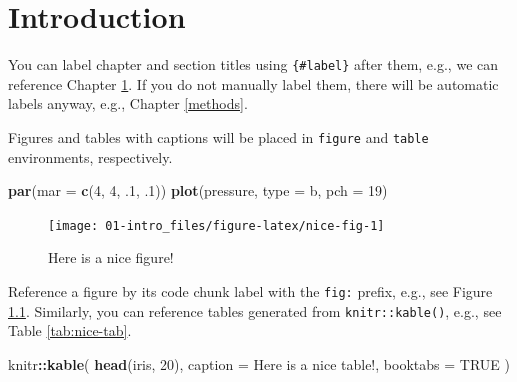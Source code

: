 \documentclass[
]{book}
\newenvironment{Shaded}{\begin{snugshade}}{\end{snugshade}}
\newcommand{\AttributeTok}[1]{\textcolor[rgb]{0.13,0.29,0.53}{#1}}
\newcommand{\ConstantTok}[1]{\textcolor[rgb]{0.56,0.35,0.01}{#1}}
\newcommand{\DecValTok}[1]{\textcolor[rgb]{0.00,0.00,0.81}{#1}}
\newcommand{\FunctionTok}[1]{\textcolor[rgb]{0.13,0.29,0.53}{\textbf{#1}}}
\newcommand{\NormalTok}[1]{#1}
\newcommand{\SpecialCharTok}[1]{\textcolor[rgb]{0.81,0.36,0.00}{\textbf{#1}}}
\newcommand{\StringTok}[1]{\textcolor[rgb]{0.31,0.60,0.02}{#1}}
\begin{document}
\chapter{Introduction}\label{intro}

You can label chapter and section titles using \texttt{\{\#label\}} after them, e.g., we can reference Chapter \ref{intro}. If you do not manually label them, there will be automatic labels anyway, e.g., Chapter \ref{methods}.

Figures and tables with captions will be placed in \texttt{figure} and \texttt{table} environments, respectively.

\begin{Shaded}
\begin{Highlighting}[]
\FunctionTok{par}\NormalTok{(}\AttributeTok{mar =} \FunctionTok{c}\NormalTok{(}\DecValTok{4}\NormalTok{, }\DecValTok{4}\NormalTok{, .}\DecValTok{1}\NormalTok{, .}\DecValTok{1}\NormalTok{))}
\FunctionTok{plot}\NormalTok{(pressure, }\AttributeTok{type =} \StringTok{\textquotesingle{}b\textquotesingle{}}\NormalTok{, }\AttributeTok{pch =} \DecValTok{19}\NormalTok{)}
\end{Highlighting}
\end{Shaded}

\begin{figure}

{\centering \texttt{[image: 01-intro\_files/figure-latex/nice-fig-1]} 

}

\caption{Here is a nice figure!}\label{fig:nice-fig}
\end{figure}

Reference a figure by its code chunk label with the \texttt{fig:} prefix, e.g., see Figure \ref{fig:nice-fig}. Similarly, you can reference tables generated from \texttt{knitr::kable()}, e.g., see Table \ref{tab:nice-tab}.

\begin{Shaded}
\begin{Highlighting}[]
\NormalTok{knitr}\SpecialCharTok{::}\FunctionTok{kable}\NormalTok{(}
  \FunctionTok{head}\NormalTok{(iris, }\DecValTok{20}\NormalTok{), }\AttributeTok{caption =} \StringTok{\textquotesingle{}Here is a nice table!\textquotesingle{}}\NormalTok{,}
  \AttributeTok{booktabs =} \ConstantTok{TRUE}
\NormalTok{)}
\end{Highlighting}
\end{Shaded}
\end{document}
